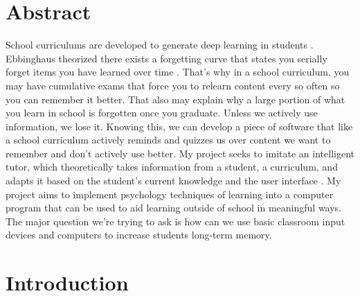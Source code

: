 \documentclass[acmtog]{acmart}
\begin{document}



\maketitle

\section{Abstract}
School curriculums are developed to generate deep learning in students \cite{zuo2021higher}. Ebbinghaus theorized there exists a forgetting curve that states you serially forget items you have learned over time \cite{murre2015replication}. That’s why in a school curriculum, you may have cumulative exams that force you to relearn content every so often so you can remember it better. That also may explain why a large portion of what you learn in school is forgotten once you graduate. Unless we actively use information, we lose it. Knowing this, we can develop a piece of software that like a school curriculum actively reminds and quizzes us over content we want to remember and don’t actively use better. My project seeks to imitate an intelligent tutor, which theoretically takes information from a student, a curriculum, and adapts it based on the student’s current knowledge and the user interface \cite{bradavc2017intelligent}. My project aims to implement psychology techniques of learning into a computer program that can be used to aid learning outside of school in meaningful ways. The major question we're trying to ask is how can we use basic classroom input devices and computers to increase students long-term memory.

\section{Introduction}
\end{document}
